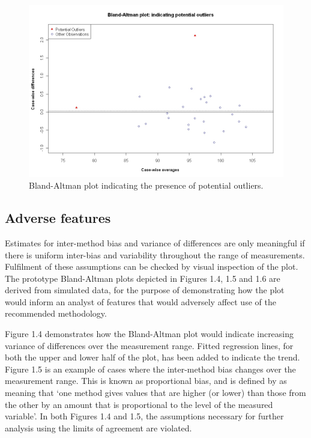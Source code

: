\documentclass[Main.tex]{subfiles}
\begin{document}
	\begin{figure}[h!]
		\begin{center}
			\includegraphics[width=125mm]{images/BAOutliers.jpeg}
			\caption{Bland-Altman plot indicating the presence of potential outliers.}\label{Outliers}
		\end{center}
	\end{figure}


	\subsection{Adverse features}
	
	Estimates for inter-method bias and variance of differences are only meaningful if there is uniform inter-bias and variability throughout the range of measurements. Fulfilment of these assumptions can be checked by visual inspection of the plot. The prototype Bland-Altman plots depicted in Figures 1.4, 1.5 and 1.6 are derived from simulated data, for the purpose of demonstrating how the plot would inform an analyst of features that would adversely affect use of the recommended methodology.
	
	Figure 1.4 demonstrates how the Bland-Altman plot would indicate increasing variance of differences over the measurement range. Fitted regression lines, for both the upper and lower half of the plot, has been added to indicate the trend. Figure 1.5 is an example of cases where the inter-method bias changes over the measurement range. This is known as proportional bias, and is defined by \citet{ludbrook97} as meaning that `one method gives	values that are higher (or lower) than those from the other by an amount that is proportional to the level of the measured variable'. In both Figures 1.4 and 1.5, the assumptions necessary for further analysis using the limits of agreement are violated.
	
\end{document}
